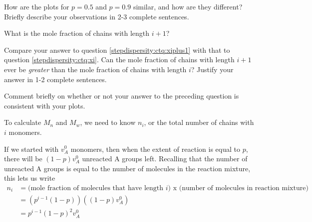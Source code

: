 \begin{activity}
\begin{ctqs}
		\begin{solution}[2.75in]
		\end{solution}
	
	\question How are the plots for $p=0.5$ and $p=0.9$ similar, and how are they different?  Briefly describe your observations in 2-3 complete sentences.
	
		\begin{solution}[1.5in]
		\end{solution}
	
	\question \label{stepdispersity:ctq:xiplus1} What is the mole fraction of chains with length $i+1$?
	
		\begin{solution}[0.5in]
		\end{solution}
	
	\question Compare your answer to question \ref{stepdispersity:ctq:xiplus1} with that to question \ref{stepdispersity:ctq:xi}. Can the mole fraction of chains with length $i+1$ ever be \emph{greater} than the mole fraction of chains with length $i$?  Justify your answer in 1-2 complete sentences.
	
		\begin{solution}[1.5in]
		\end{solution}
	
	\question Comment briefly on whether or not your answer to the preceding question is consistent with your plots.
	
		\begin{solution}[1in]
		\end{solution}
	
\end{ctqs}


\begin{model}

	To calculate $M_n$ and $M_w$, we need to know $n_i$, or the total number of chains with $i$ monomers.
	
	If we started with $v_A^0$ monomers, then when the extent of reaction is equal to $p$, there will be $(1-p)v_A^0$ unreacted A groups left.  Recalling that the number of unreacted A groups is equal to the number of molecules in the reaction mixture, this lets us write
	\begin{align*}
		n_i &= \text{(mole fraction of molecules that have length }i\text{) x (number of molecules in reaction mixture)}\\
			&= \left(p^{i-1}(1-p)\right)\left((1-p)v_A^0\right)\\
			&= p^{i-1}(1-p)^2v_A^0
	\end{align*}
	

\end{model}
\end{activity}
